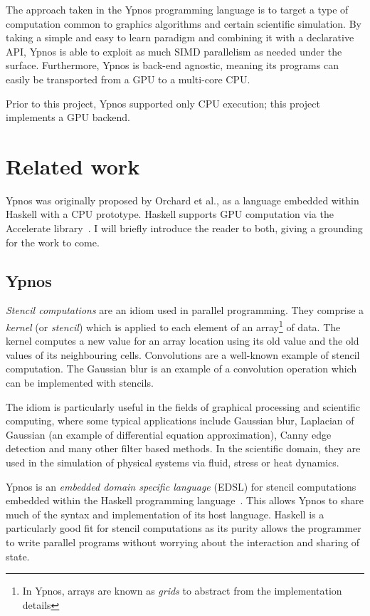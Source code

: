 \documentclass[12pt,a4paper,twoside]{scrbook}
\begin{document}
The approach taken in the Ypnos programming language is to target a type of
computation common to graphics algorithms and certain scientific simulation. By
taking a simple and easy to learn paradigm and combining it with a declarative
API, Ypnos is able to exploit as much SIMD parallelism as needed under the
surface. Furthermore, Ypnos is back-end agnostic, meaning its programs can
easily be transported from a GPU to a multi-core CPU.

Prior to this project, Ypnos supported only CPU execution; this project
implements a GPU backend.

\section{Related work}

Ypnos was originally proposed by Orchard et al.\cite{ypnos-damp10}, as a
language embedded within Haskell with a CPU prototype. Haskell supports GPU
computation via the Accelerate library~\cite{acc-damp11}. I will briefly
introduce the reader to both, giving a grounding for the work to come.

\subsection{Ypnos}

\emph{Stencil computations} are an idiom used in parallel programming.  They
comprise a \emph{kernel} (or \emph{stencil}) which is applied to each element of
an array\footnote{In Ypnos, arrays are known as \emph{grids} to abstract from
  the implementation details} of data. The kernel computes a new value for an
array location using its old value and the old values of its neighbouring
cells. Convolutions are a well-known example of stencil computation. The
Gaussian blur is an example of a convolution operation which can be
implemented with stencils.

The idiom is particularly useful in the fields of graphical processing and
scientific computing, where some typical applications include Gaussian blur,
Laplacian of Gaussian (an example of differential equation approximation), Canny
edge detection and many other filter based methods. In the scientific domain,
they are used in the simulation of physical systems via fluid, stress or heat
dynamics.

Ypnos is an \emph{embedded domain specific language} (EDSL) for stencil
computations embedded within the Haskell programming
language~\cite{ypnos-damp10, ypnos-dsl11}. This allows Ypnos to share much of
the syntax and implementation of its host language. Haskell is a particularly
good fit for stencil computations as its purity allows the programmer to write
parallel programs without worrying about the interaction and sharing of state.
\end{document}
